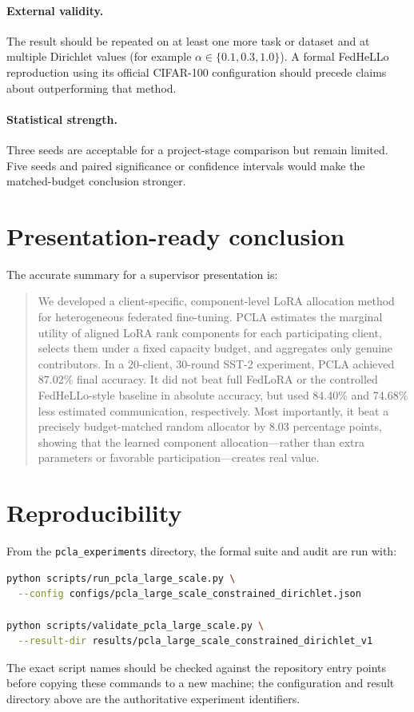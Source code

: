 \documentclass[11pt,a4paper]{article}
\begin{document}
\paragraph{External validity.}
The result should be repeated on at least one more task or dataset and at
multiple Dirichlet values (for example $\alpha\in\{0.1,0.3,1.0\}$). A formal
FedHeLLo reproduction using its official CIFAR-100 configuration should precede
claims about outperforming that method.

\paragraph{Statistical strength.}
Three seeds are acceptable for a project-stage comparison but remain limited.
Five seeds and paired significance or confidence intervals would make the
matched-budget conclusion stronger.

\section{Presentation-ready conclusion}

The accurate summary for a supervisor presentation is:
\begin{quote}
We developed a client-specific, component-level LoRA allocation method for
heterogeneous federated fine-tuning. PCLA estimates the marginal utility of
aligned LoRA rank components for each participating client, selects them under
a fixed capacity budget, and aggregates only genuine contributors. In a
20-client, 30-round SST-2 experiment, PCLA achieved 87.02\% final accuracy. It
did not beat full FedLoRA or the controlled FedHeLLo-style baseline in absolute
accuracy, but used 84.40\% and 74.68\% less estimated communication,
respectively. Most importantly, it beat a precisely budget-matched random
allocator by 8.03 percentage points, showing that the learned component
allocation---rather than extra parameters or favorable participation---creates
real value.
\end{quote}

\section{Reproducibility}

From the \texttt{pcla\_experiments} directory, the formal suite and audit are
run with:
\begin{lstlisting}[language=bash,numbers=none]
python scripts/run_pcla_large_scale.py \
  --config configs/pcla_large_scale_constrained_dirichlet.json

python scripts/validate_pcla_large_scale.py \
  --result-dir results/pcla_large_scale_constrained_dirichlet_v1
\end{lstlisting}
The exact script names should be checked against the repository entry points
before copying these commands to a new machine; the configuration and result
directory above are the authoritative experiment identifiers.
\end{document}
